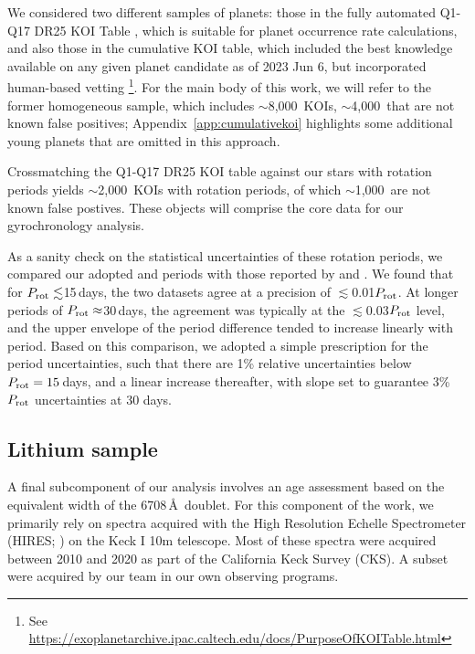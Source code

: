 \documentclass[11pt,twocolumn,tighten]{aastex63}
\newcommand{\nkois}{{$\sim$8{,}000}} %
\newcommand{\nkoisnofp}{{$\sim$4{,}000}} %
\newcommand{\nkoiswithprot}{{$\sim$2{,}000}}
\newcommand{\nkoisnofpwithprot}{{$\sim$1{,}000}}
\begin{document}
We considered two different samples of planets: those in the fully
automated Q1-Q17 DR25 KOI Table \citep{Thompson_2018}, which is
suitable for planet occurrence rate calculations, and also those in
the cumulative KOI table, which included the best knowledge available
on any given planet candidate as of 2023 Jun 6, but incorporated
human-based vetting \footnote{See
\url{https://exoplanetarchive.ipac.caltech.edu/docs/PurposeOfKOITable.html}}.
For the main body of this work, we will refer to the former
homogeneous sample, which includes \nkois\ KOIs, \nkoisnofp\ that are
not known false positives; Appendix~\ref{app:cumulativekoi} highlights
some additional young planets that are omitted in this approach.

Crossmatching the Q1-Q17 DR25 KOI table against our stars with
rotation periods yields \nkoiswithprot\ KOIs with rotation periods, of which \nkoisnofpwithprot\ 
are not known false postives.
These objects will comprise the core data for our gyrochronology analysis.

As a sanity check on the statistical uncertainties of these rotation
periods, we compared our adopted \citetalias{Santos_2019} and
 periods with those reported by
\citet{McQuillan_2014} and \citet{Mazeh_2015}.
We found that for $P_{\rm rot}\lesssim$15\,days, the two 
datasets agree at a precision of $\lesssim$0.01$P_{\rm rot}$.  At longer periods of 
$P_{\rm rot}\approx$30\,days, the agreement was typically at the
$\lesssim$0.03$P_{\rm rot}$ level, and
the upper envelope of the period difference tended to increase
linearly with period.
Based on this comparison, we adopted a simple prescription for the
period uncertainties,
such that there are 1\% relative uncertainties below $P_{\rm
rot}=15$\,days, and a linear increase thereafter, with slope set to
guarantee 3\% $P_{\rm rot}$ uncertainties at 30 days.



\subsection{Lithium sample}
A final subcomponent of our analysis involves an age assessment based on
the equivalent width of the \ion{Li}{1} 6708\,\AA\ doublet.  For this
component of the work, we primarily rely on spectra acquired with the
High Resolution Echelle Spectrometer (HIRES;
\citealt{vogt_hires_1994}) on the Keck I 10m telescope.
Most of these spectra were acquired between 2010 and 2020
as part of the California Keck Survey (CKS).
A subset were acquired by our team in our own observing programs.
\end{document}

